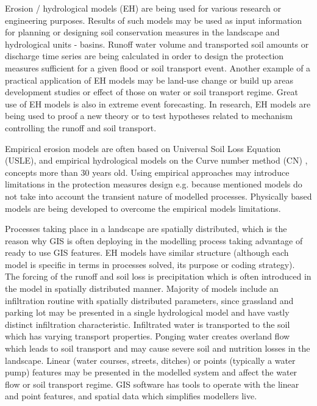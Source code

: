 Erosion / hydrological models (EH) are being used for various research or engineering purposes. 
Results of such models may be used as input information for planning 
or designing soil conservation measures in the landscape and hydrological units - basins. 
Runoff water volume and transported soil amounts
or discharge time series are being calculated
in order to design the protection measures sufficient for a given flood 
or soil transport event. Another example of a practical 
application of EH models may be land-use change or build up areas development studies 
or effect of those on water or soil transport regime. 
Great use of EH models is also in extreme event 
forecasting. In research, EH models 
are being used to proof a new theory or to test hypotheses related 
to mechanism controlling the runoff and soil transport.

Empirical erosion models are often based on Universal Soil Loss Equation (USLE), 
\cite{wischmeier1978,renard1997} and empirical hydrological models on the Curve 
number method (CN) \cite{cronshey1986}, concepts more than 30 years old. 
Using empirical approaches may introduce limitations in the protection measures design e.g. 
because mentioned models do not take into account the transient nature of modelled processes. 
Physically based models are being developed to overcome the empirical models limitations. 

Processes taking place in a landscape are spatially distributed, which is the reason why GIS 
is often deploying in the modelling process taking advantage 
of ready to use GIS features. EH models have similar structure 
(although each model is specific in terms in processes solved, 
its purpose or coding strategy). The forcing of the runoff and soil loss is precipitation
which is often introduced in the model in spatially distributed 
manner. Majority of models include an infiltration routine with 
spatially distributed parameters, since grassland 
and parking lot may be presented in a single hydrological model 
and have vastly distinct infiltration characteristic. Infiltrated 
water is transported to the soil which has varying transport properties. 
Ponging water creates overland flow which leads to soil transport 
and may cause severe soil and nutrition losses in the landscape. 
Linear (water courses, streets, ditches) 
or points (typically a water pump) features may be presented  
in the modelled system and affect the water flow or soil transport regime. 
GIS software has tools to operate with the linear and point features, 
and spatial data which simplifies modellers live.


